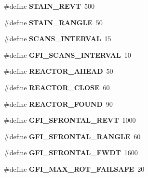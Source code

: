 \begin{DoxyCompactItemize}
\item 
\hypertarget{reactor_8nxc_a23085c5995bfb533de15f749911735ee}{
\#define {\bfseries STAIN\_\-REVT}~500}
\label{reactor_8nxc_a23085c5995bfb533de15f749911735ee}

\item 
\hypertarget{reactor_8nxc_aa065f0a3dcd588addce086ed8e16ef21}{
\#define {\bfseries STAIN\_\-RANGLE}~50}
\label{reactor_8nxc_aa065f0a3dcd588addce086ed8e16ef21}

\item 
\hypertarget{reactor_8nxc_a0ffed1b076ac2fe20116fa0f0ae633f1}{
\#define {\bfseries SCANS\_\-INTERVAL}~15}
\label{reactor_8nxc_a0ffed1b076ac2fe20116fa0f0ae633f1}

\item 
\hypertarget{reactor_8nxc_a3c84fa327c80928102bf5fcd704df9e6}{
\#define {\bfseries GFI\_\-SCANS\_\-INTERVAL}~10}
\label{reactor_8nxc_a3c84fa327c80928102bf5fcd704df9e6}

\item 
\hypertarget{reactor_8nxc_ad57e5a239da13ddea4ab2548b177dcf3}{
\#define {\bfseries REACTOR\_\-AHEAD}~50}
\label{reactor_8nxc_ad57e5a239da13ddea4ab2548b177dcf3}

\item 
\hypertarget{reactor_8nxc_a900c7579f499cdcaf00704ae6598036a}{
\#define {\bfseries REACTOR\_\-CLOSE}~60}
\label{reactor_8nxc_a900c7579f499cdcaf00704ae6598036a}

\item 
\hypertarget{reactor_8nxc_a05ff785034efa7b287ee834f9ccb74f1}{
\#define {\bfseries REACTOR\_\-FOUND}~90}
\label{reactor_8nxc_a05ff785034efa7b287ee834f9ccb74f1}

\item 
\hypertarget{reactor_8nxc_ae981e3a47c44d4878baa7c830f5b846a}{
\#define {\bfseries GFI\_\-SFRONTAL\_\-REVT}~1000}
\label{reactor_8nxc_ae981e3a47c44d4878baa7c830f5b846a}

\item 
\hypertarget{reactor_8nxc_ae6cb54a3555702c9db09d084dba51143}{
\#define {\bfseries GFI\_\-SFRONTAL\_\-RANGLE}~60}
\label{reactor_8nxc_ae6cb54a3555702c9db09d084dba51143}

\item 
\hypertarget{reactor_8nxc_adee1b3613cfe237cecaba8f2d6f8ecdc}{
\#define {\bfseries GFI\_\-SFRONTAL\_\-FWDT}~1600}
\label{reactor_8nxc_adee1b3613cfe237cecaba8f2d6f8ecdc}

\item 
\hypertarget{reactor_8nxc_a24ced77f76e8a86e359fd77bc1ab9ce2}{
\#define {\bfseries GFI\_\-MAX\_\-ROT\_\-FAILSAFE}~20}
\label{reactor_8nxc_a24ced77f76e8a86e359fd77bc1ab9ce2}


\end{DoxyCompactItemize}
